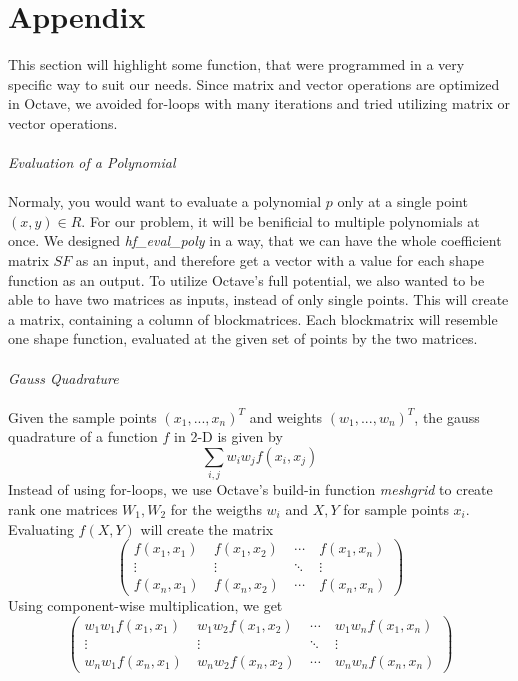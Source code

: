 \documentclass[a4paper,12pt]{article}
\begin{document}
\section{Appendix}
This section will highlight some function, that were programmed in a very specific way to suit our needs. Since matrix and vector operations are optimized in Octave, we avoided for-loops with many iterations and tried utilizing matrix or vector operations.\\ \\
\textit{Evaluation of a Polynomial}\\ \\
Normaly, you would want to evaluate a polynomial $p$ only at a single point $(x,y)\in\!R$. For our problem, it will be benificial to multiple polynomials at once. We designed \textit{hf\_eval\_poly} in a way, that we can have the whole coefficient matrix $SF$ as an input, and therefore get a vector with a value for each shape function as an output. To utilize Octave's full potential, we also wanted to be able to have two matrices as inputs, instead of only single points. This will create a matrix, containing a column of blockmatrices. Each blockmatrix will resemble one shape function, evaluated at the given set of points by the two matrices.\\ \\
\newpage
\textit{Gauss Quadrature}\\ \\
Given the sample points $(x_1,...,x_n)^T$ and weights $(w_1,...,w_n)^T$, the gauss quadrature of a function $f$ in 2-D is given by
\[\sum_{i,j} w_i w_j f(x_i,x_j)\]
Instead of using for-loops, we use Octave's build-in function \textit{meshgrid} to create rank one matrices $W_1,W_2$ for the weigths $w_i$ and $X,Y$ for sample points $x_i$. Evaluating $f(X,Y)$ will create the matrix 
\[\begin{pmatrix} f(x_1,x_1) &\ f(x_1,x_2) &\ \cdots &\ f(x_1,x_n) \\
\vdots &\ \vdots &\ \ddots &\ \vdots \\ 
f(x_n,x_1) &\ f(x_n,x_2) &\ \cdots &\ f(x_n,x_n) \end{pmatrix} \]
Using component-wise multiplication, we get 
\[\begin{pmatrix} w_1 w_ 1f(x_1,x_1) &\ w_1 w_2 f(x_1,x_2) &\ \cdots &\ w_1 w_n f(x_1,x_n) \\
\vdots &\ \vdots &\ \ddots &\ \vdots \\ 
w_n w_1 f(x_n,x_1) &\ w_n w_2 f(x_n,x_2) &\ \cdots &\ w_n w_n f(x_n,x_n) \end{pmatrix} \]
\end{document}
